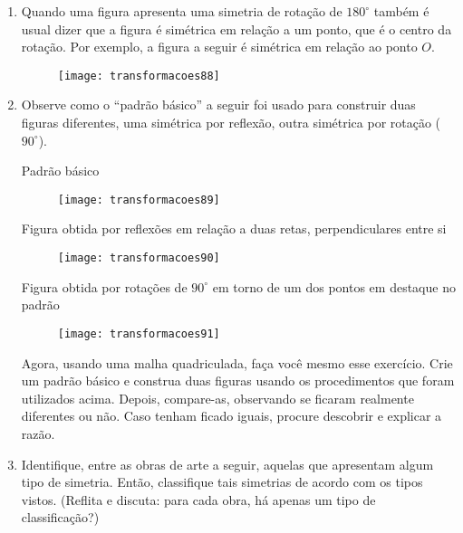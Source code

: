 \begin{enumerate}
 

\item Quando uma figura apresenta uma simetria de rotação de $180^{\circ}$ também é usual dizer que a figura é simétrica em relação a um ponto, que é o centro da rotação. Por exemplo, a figura a seguir é simétrica em relação ao ponto $O$. 

\begin{figure}[H]
\centering

\texttt{[image: transformacoes88]}
\end{figure}


\item Observe como o “padrão básico” a seguir foi usado para construir duas figuras diferentes, uma simétrica por reflexão, outra simétrica por rotação ($90^{\circ}$). 

Padrão básico
 
\begin{figure}[H]
\centering

\texttt{[image: transformacoes89]}
\end{figure}

Figura obtida por reflexões em relação a duas retas, perpendiculares entre si

\begin{figure}[H]
\centering

\texttt{[image: transformacoes90]}
\end{figure}

 
Figura obtida por rotações de $90^{\circ}$ em torno de um dos pontos em destaque no padrão

\begin{figure}[H]
\centering

\texttt{[image: transformacoes91]}
\end{figure}
 

Agora, usando uma malha quadriculada, faça você mesmo esse exercício. Crie um padrão básico e construa duas figuras usando os procedimentos que foram utilizados acima. Depois, compare-as, observando se ficaram realmente diferentes ou não. Caso tenham ficado iguais, procure descobrir e explicar a razão. 


\item Identifique, entre as obras de arte a seguir, aquelas que apresentam algum tipo de simetria. Então, classifique tais simetrias de acordo com os tipos vistos. (Reflita e discuta: para cada obra, há apenas um tipo de classificação?)


\end{enumerate}
